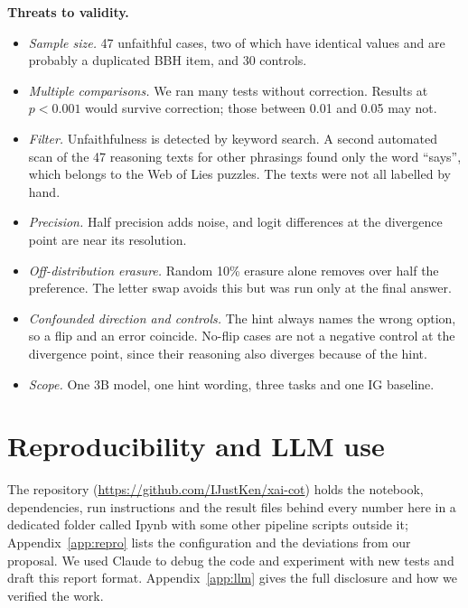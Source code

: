 \documentclass[10pt,a4paper,twocolumn]{article}
\newcommand{\para}[1]{\textbf{#1}}
\begin{document}
\para{Threats to validity.}
\begin{itemize}
\item \emph{Sample size.} 47 unfaithful cases, two of which have identical values and are probably a duplicated BBH item, and 30 controls.
\item \emph{Multiple comparisons.} We ran many tests without correction. Results at $p<0.001$ would survive correction; those between 0.01 and 0.05 may not.
\item \emph{Filter.} Unfaithfulness is detected by keyword search. A second automated scan of the 47 reasoning texts for other phrasings found only the word ``says'', which belongs to the Web of Lies puzzles. The texts were not all labelled by hand.
\item \emph{Precision.} Half precision adds noise, and logit differences at the divergence point are near its resolution.
\item \emph{Off-distribution erasure.} Random 10\% erasure alone removes over half the preference. The letter swap avoids this but was run only at the final answer.
\item \emph{Confounded direction and controls.} The hint always names the wrong option, so a flip and an error coincide. No-flip cases are not a negative control at the divergence point, since their reasoning also diverges because of the hint.
\item \emph{Scope.} One 3B model, one hint wording, three tasks and one IG baseline.
\end{itemize}

\section{Reproducibility and LLM use}

The repository (\href{https://github.com/IJustKen/xai_cot}{https://github.com/IJustKen/xai-cot}) holds the notebook, dependencies, run instructions and the result files behind every number here in a dedicated folder called Ipynb with some other pipeline scripts outside it; Appendix~\ref{app:repro} lists the configuration and the deviations from our proposal. We used Claude to debug the code and experiment with new tests and draft this report format. Appendix~\ref{app:llm} gives the full disclosure and how we verified the work.
\end{document}
